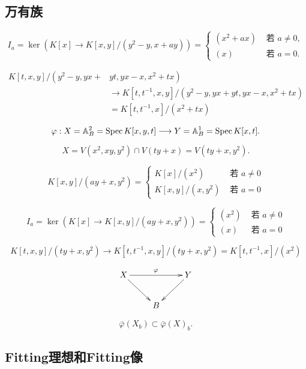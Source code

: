 \subsection{万有族}\label{s:5.1.2}


\[
    I_a=\ker\left(K[x] \rightarrow K[x, y] /\left(y^2-y, x+a y\right)\right)= 
    \begin{cases}
        (x^2+a x) & \text{ 若 } a \neq 0, \\
        (x) & \text{ 若 } a=0.
    \end{cases}
\]

\[
    \begin{aligned}
        K[t, x, y] /\left(y^2-y, y x+\right. & \left.y t, y x-x, x^2+t x\right) \\
        & \rightarrow K\left[t, t^{-1}, x, y\right] /\left(y^2-y, y x+y t, y x-x, x^2+t x\right) \\
        & =K\left[t, t^{-1}, x\right] /\left(x^2+t x\right)
    \end{aligned}
\]


\[
    \varphi: X=\mathbb{A}_B^2=\operatorname{Spec} K[x, y, t] \longrightarrow Y=\mathbb{A}_B^1=\operatorname{Spec} K[x, t].
\]

\[
    X=V\left(x^2, x y, y^2\right) \cap V(t y+x)=V\left(t y+x, y^2\right).
\]



\[
    K[x, y] /\left(a y+x, y^2\right)= 
    \begin{cases}K[x] /\left(x^2\right) & \text { 若 } a \neq 0 \\ 
        K[x, y] /\left(x, y^2\right) & \text { 若 } a=0\end{cases}
\]

\[
    I_a=\ker\left(K[x] \rightarrow K[x, y] /\left(a y+x, y^2\right)\right)= 
    \begin{cases}\left(x^2\right) & \text { 若 } a \neq 0 \\ 
        (x) & \text { 若 } a=0\end{cases}
\]

\[
    K[t, x, y] /\left(t y+x, y^2\right) \rightarrow K\left[t, t^{-1}, x, y\right] /
    \left(t y+x, y^2\right)=K\left[t, t^{-1}, x\right] /\left(x^2\right)
\]

\[
    \xymatrix{
        X\ar[rr]^\varphi\ar[rd]&&Y\ar[ld]\\
        &B&
    }
\]

\[
    \bar{\varphi}\left(X_b\right) \subset \bar{\varphi}(X)_b.
\]


\subsection{Fitting理想和Fitting像}\label{s:5.1.3}